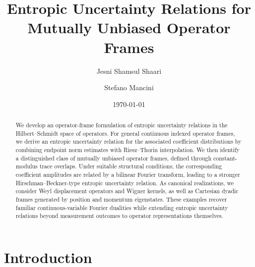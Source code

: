 \documentclass[aps,pra,onecolumn,nofootinbib,superscriptaddress,showpacs]{revtex4}
\begin{document}
\title{Entropic Uncertainty Relations for Mutually Unbiased Operator Frames}

\author{Jesni Shamsul Shaari}

\author{Stefano Mancini}

\date{\today}

\begin{abstract}
We develop an operator-frame formulation of entropic uncertainty relations in the Hilbert--Schmidt space of operators. For general continuous indexed operator frames, we derive an entropic uncertainty relation for the associated coefficient distributions by combining endpoint norm estimates with Riesz--Thorin interpolation. We then identify a distinguished class of mutually unbiased operator frames, defined through constant-modulus trace overlaps. Under suitable structural conditions, the corresponding coefficient amplitudes are related by a bilinear Fourier transform, leading to a stronger Hirschman--Beckner-type entropic uncertainty relation. As canonical realizations, we consider Weyl displacement operators and Wigner kernels, as well as Cartesian dyadic frames generated by position and momentum eigenstates. These examples recover familiar continuous-variable Fourier dualities while extending entropic uncertainty relations beyond measurement outcomes to operator representations themselves.
\end{abstract}




\maketitle

\section{Introduction}
\end{document}
